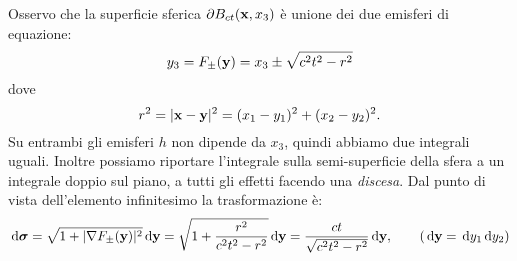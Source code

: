 Osservo che la superficie sferica $\displaystyle \partial B_{ct}(\mathbf{x} ,x_{3})$ è unione dei due emisferi di equazione:
\begin{equation*}
    y_{3} =F_{\pm }(\mathbf{y}) =x_{3} \pm \sqrt{c^{2} t^{2} -r^{2}}
\end{equation*}
dove
\begin{equation*}
    r^{2} =| \mathbf{x} -\mathbf{y}| ^{2} =(x_{1} -y_{1})^{2} +(x_{2} -y_{2})^{2} .
\end{equation*}
Su entrambi gli emisferi $h$ non dipende da $\displaystyle x_{3}$, quindi abbiamo due integrali uguali. Inoltre possiamo riportare l'integrale sulla semi-superficie della sfera a un integrale doppio sul piano, a tutti gli effetti facendo una \textit{discesa}. Dal punto di vista dell'elemento infinitesimo la trasformazione è:
\begin{equation*}
    \,\mathrm d \bm{\sigma} =\sqrt{1+| \nabla F_{\pm }(\mathbf{y})| ^{2}} \,\mathrm d \mathbf{y} =\sqrt{1+\frac{r^{2}}{c^{2} t^{2} -r^{2}}} \,\mathrm d \mathbf{y} =\frac{ct}{\sqrt{c^{2} t^{2} -r^{2}}} \,\mathrm d \mathbf{y},\qquad  (\,\mathrm d \mathbf{y} =\,\mathrm d y_{1} \,\mathrm d y_{2})
\end{equation*}
